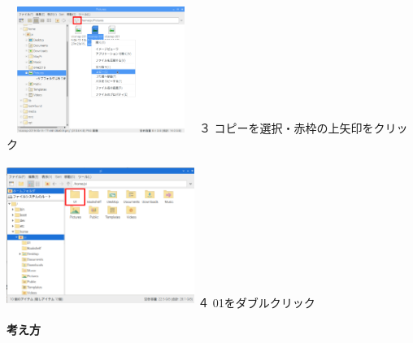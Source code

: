 \documentclass[a4paper,12pt]{jarticle}
\begin{document}
\bigskip

\begin{minipage}{6.413cm}
  \includegraphics[width=6.146cm,height=4.114cm]{textbook-img163.png}
  \newline
  ３
  コピーを選択・赤枠の上矢印をクリック
\end{minipage}
\hspace{10mm}
\begin{minipage}{6.5cm}
  \includegraphics[width=6.1cm,height=4.646cm]{textbook-img167.png}
  \newline
  ４ 01をダブルクリック
\end{minipage}

\clearpage
\flushleft

\textbf{考え方}


\bigskip


\bigskip


\bigskip
\end{document}
